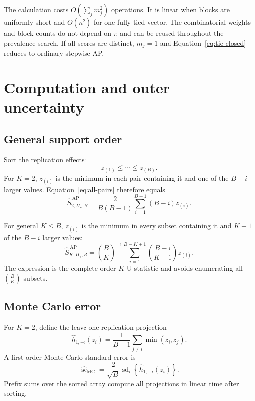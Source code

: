 \documentclass[11pt]{article}
\newcommand{\PSet}{\Pi_\star}
\theoremstyle{remark}
\begin{document}
The calculation costs $O(\sum_jm_j^2)$ operations. It is linear when blocks are uniformly short and $O(n^2)$ for one fully tied vector. The combinatorial weights and block counts do not depend on $\pi$ and can be reused throughout the prevalence search. If all scores are distinct, $m_j=1$ and Equation~\eqref{eq:tie-closed} reduces to ordinary stepwise AP.

\section{Computation and outer uncertainty}
\label{app:computation}

\subsection{General support order}

Sort the replication effects:
\[
z_{(1)}\leq\cdots\leq z_{(B)}.
\]
For $K=2$, $z_{(i)}$ is the minimum in each pair containing it and one of the $B-i$ larger values. Equation~\eqref{eq:all-pairs} therefore equals
\begin{equation}
\widehat S_{2,\PSet,B}^{\,\mathrm{AP}}
=
\frac{2}{B(B-1)}
\sum_{i=1}^{B-1}(B-i)z_{(i)}.
\label{eq:sorted-k2}
\end{equation}

For general $K\leq B$, $z_{(i)}$ is the minimum in every subset containing it and $K-1$ of the $B-i$ larger values:
\begin{equation}
\widehat S_{K,\PSet,B}^{\,\mathrm{AP}}
=
\binom BK^{-1}
\sum_{i=1}^{B-K+1}
\binom{B-i}{K-1}z_{(i)}.
\label{eq:sorted-k}
\end{equation}
The expression is the complete order-$K$ U-statistic and avoids enumerating all $\binom BK$ subsets.

\subsection{Monte Carlo error}

For $K=2$, define the leave-one replication projection
\[
\widehat h_{1,-i}(z_i)
=
\frac1{B-1}\sum_{j\ne i}\min(z_i,z_j).
\]
A first-order Monte Carlo standard error is
\begin{equation}
\widehat{\operatorname{se}}_{\mathrm{MC}}
=
\frac2{\sqrt B}
\operatorname{sd}_{i}
\left\{
\widehat h_{1,-i}(z_i)
\right\}.
\label{eq:mcse}
\end{equation}
Prefix sums over the sorted array compute all projections in linear time after sorting.
\end{document}
